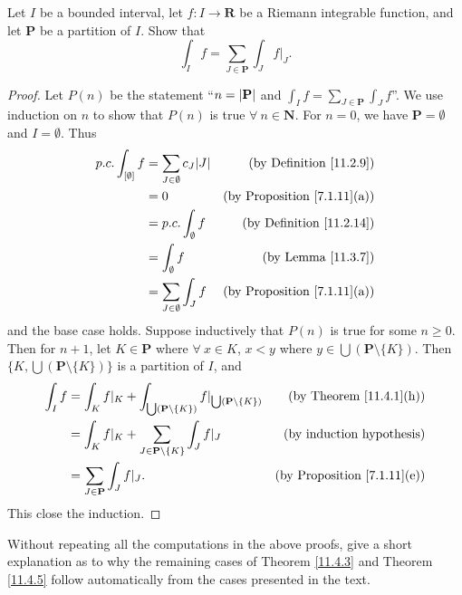 \begin{exercise}\label{ex 11.4.3}
    Let \(I\) be a bounded interval, let \(f : I \to \mathbf{R}\) be a Riemann integrable function, and let \(\mathbf{P}\) be a partition of \(I\).
    Show that
    \[
        \int_I f = \sum_{J \in \mathbf{P}} \int_J f|_J.
    \]
\end{exercise}

\begin{proof}
    Let \(P(n)\) be the statement ``\(n = \abs*{\mathbf{P}}\) and \(\int_I f = \sum_{J \in \mathbf{P}} \int_J f\)''.
    We use induction on \(n\) to show that \(P(n)\) is true \(\forall\ n \in \mathbf{N}\).
    For \(n = 0\), we have \(\mathbf{P} = \emptyset\) and \(I = \emptyset\).
    Thus
    \begin{align*}
        p.c. \int_{[\emptyset]} f & = \sum_{J \in \emptyset} c_J \abs*{J} & \text{(by Definition \ref{11.2.9})}     \\
                                  & = 0                                   & \text{(by Proposition \ref{7.1.11}(a))} \\
                                  & = p.c. \int_{\emptyset} f             & \text{(by Definition \ref{11.2.14})}    \\
                                  & = \int_{\emptyset} f                  & \text{(by Lemma \ref{11.3.7})}          \\
                                  & = \sum_{J \in \emptyset} \int_J f     & \text{(by Proposition \ref{7.1.11}(a))}
    \end{align*}
    and the base case holds.
    Suppose inductively that \(P(n)\) is true for some \(n \geq 0\).
    Then for \(n + 1\), let \(K \in \mathbf{P}\) where \(\forall\ x \in K\), \(x < y\) where \(y \in \bigcup (\mathbf{P} \setminus \{K\})\).
    Then \(\{K, \bigcup (\mathbf{P} \setminus \{K\})\}\) is a partition of \(I\), and
    \begin{align*}
        \int_I f & = \int_K f|_K + \int_{\bigcup (\mathbf{P} \setminus \{K\})} f|_{\bigcup (\mathbf{P} \setminus \{K\})} & \text{(by Theorem \ref{11.4.1}(h))}     \\
                 & = \int_K f|_K + \sum_{J \in \mathbf{P} \setminus \{K\}} \int_J f|_J                                   & \text{(by induction hypothesis)}        \\
                 & = \sum_{J \in \mathbf{P}} \int_J f|_J.                                                                & \text{(by Proposition \ref{7.1.11}(e))}
    \end{align*}
    This close the induction.
\end{proof}

\begin{exercise}\label{ex 11.4.4}
    Without repeating all the computations in the above proofs, give a short explanation as to why the remaining cases of Theorem \ref{11.4.3} and Theorem \ref{11.4.5} follow automatically from the cases presented in the text.
\end{exercise}